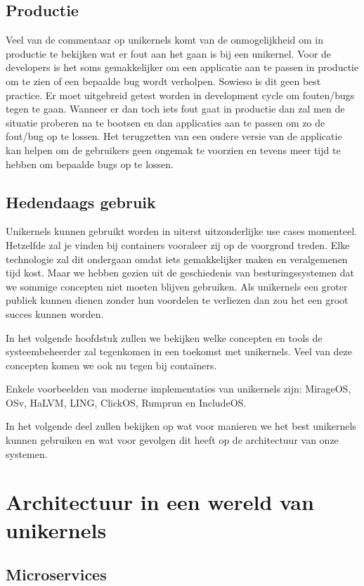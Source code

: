\documentclass[pdftex,a4paper,12pt,twoside]{report}
\begin{document}
\section{Productie}

Veel van de commentaar op unikernels komt van de onmogelijkheid om in productie te bekijken wat er fout aan het gaan is bij een unikernel. Voor de developers is het soms gemakkelijker om een applicatie aan te passen in productie om te zien of een bepaalde bug wordt verholpen. Sowieso is dit geen best practice. Er moet uitgebreid getest worden in development cycle om fouten/bugs tegen te gaan. Wanneer er dan toch iets fout gaat in productie dan zal men de situatie proberen na te bootsen en dan applicaties aan te passen om zo de fout/bug op te lossen. Het terugzetten van een oudere versie van de applicatie kan helpen om de gebruikers geen ongemak te voorzien en tevens meer tijd te hebben om bepaalde bugs op te lossen.
\section{Hedendaags gebruik}

Unikernels kunnen gebruikt worden in uiterst uitzonderlijke use cases momenteel. Hetzelfde zal je vinden bij containers vooraleer zij op de voorgrond treden. Elke technologie zal dit ondergaan omdat iets gemakkelijker maken en veralgemenen tijd kost. Maar we hebben gezien uit de geschiedenis van besturingssystemen dat we sommige concepten niet moeten blijven gebruiken. Als unikernels een groter publiek kunnen dienen zonder hun voordelen te verliezen dan zou het een groot succes kunnen worden. 

In het volgende hoofdstuk zullen we bekijken welke concepten en tools de systeembeheerder zal tegenkomen in een toekomst met unikernels. Veel van deze concepten komen we ook nu tegen bij containers.

Enkele voorbeelden van moderne implementaties van unikernels zijn: MirageOS, OSv, HaLVM, LING, ClickOS, Rumprun en IncludeOS.

In het volgende deel zullen bekijken op wat voor manieren we het best unikernels kunnen gebruiken en wat voor gevolgen dit heeft op de architectuur van onze systemen.

\chapter{Architectuur in een wereld van unikernels}
\section{Microservices}
\end{document}
